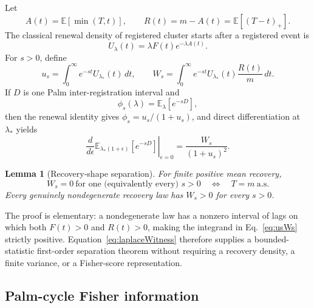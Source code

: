 \documentclass[aps,prapplied,preprint,nofootinbib]{revtex4-2}
\newtheorem{lemma}{Lemma}
\newcommand{\E}{\mathbb E}
\begin{document}
Let
\begin{equation}
A(t)=\E[\min(T,t)],
\qquad
R(t)=m-A(t)=\E[(T-t)_+].
\end{equation}
The classical renewal density of registered cluster starts after a registered event is
\begin{equation}
U_\lambda(t)
=\lambda F(t)e^{-\lambda A(t)}.
\label{eq:renewalDensity}
\end{equation}
For $s>0$, define
\begin{equation}
u_s=\int_0^\infty e^{-st}U_{\lambda_*}(t)\,dt,
\qquad
W_s=\int_0^\infty e^{-st}U_{\lambda_*}(t)\frac{R(t)}{m}\,dt.
\label{eq:usWs}
\end{equation}
If $D$ is one Palm inter-registration interval and
\begin{equation}
\phi_s(\lambda)=\E_\lambda[e^{-sD}],
\end{equation}
then the renewal identity gives $\phi_s=u_s/(1+u_s)$, and direct differentiation at $\lambda_*$ yields
\begin{equation}
\boxed{
\left.\frac{d}{d\epsilon}
\E_{\lambda_*(1+\epsilon)}[e^{-sD}]
\right|_{\epsilon=0}
=
\frac{W_s}{(1+u_s)^2}.
}
\label{eq:laplaceWitness}
\end{equation}

\begin{lemma}[Recovery-shape separation]
\label{lem:Ws}
For finite positive mean recovery,
\begin{equation}
W_s=0\ \text{for one (equivalently every) }s>0
\quad\Longleftrightarrow\quad
T=m\ \text{a.s.}
\end{equation}
Every genuinely nondegenerate recovery law has $W_s>0$ for every $s>0$.
\end{lemma}

The proof is elementary: a nondegenerate law has a nonzero interval of lags on which both $F(t)>0$ and $R(t)>0$, making the integrand in Eq.~\eqref{eq:usWs} strictly positive. Equation~\eqref{eq:laplaceWitness} therefore supplies a bounded-statistic first-order separation theorem without requiring a recovery density, a finite variance, or a Fisher-score representation.

\subsection{Palm-cycle Fisher information}
\end{document}

